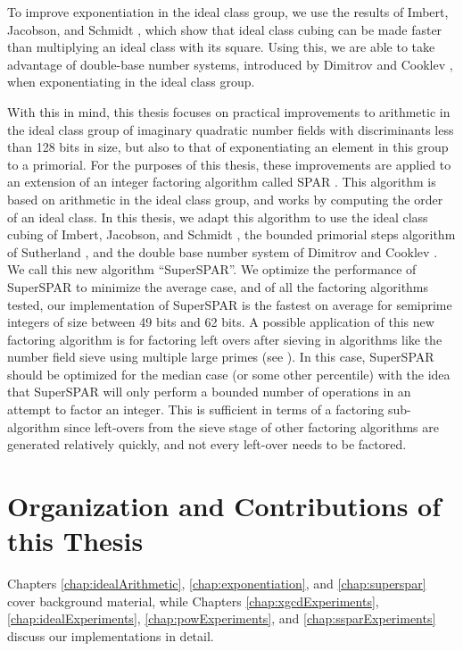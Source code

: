 \documentclass{ucalgthes1}
\theoremstyle{definition}
\begin{document}
To improve exponentiation in the ideal class group, we use the results of Imbert, Jacobson, and Schmidt \cite{Imbert2010}, which show that ideal class cubing can be made faster than multiplying an ideal class with its square.  Using this, we are able to take advantage of double-base number systems, introduced by Dimitrov and Cooklev \cite{Dimitrov1995a, Dimitrov1995b}, when exponentiating in the ideal class group.  

With this in mind, this thesis focuses on practical improvements to arithmetic in the ideal class group of imaginary quadratic number fields with discriminants less than 128 bits in size, but also to that of exponentiating an element in this group to a primorial.  For the purposes of this thesis, these improvements are applied to an extension of an integer factoring algorithm called SPAR \cite{Schnorr1984}.  This algorithm is based on arithmetic in the ideal class group, and works by computing the order of an ideal class.  In this thesis, we adapt this algorithm to use the ideal class cubing of Imbert, Jacobson, and Schmidt \cite{Imbert2010}, the bounded primorial steps algorithm of Sutherland \cite{Sutherland2007}, and the double base number system of Dimitrov and Cooklev \cite{Dimitrov1995a, Dimitrov1995b}.  We call this new algorithm ``SuperSPAR''.  We optimize the performance of SuperSPAR to minimize  the average case, and of all the factoring algorithms tested, our implementation of SuperSPAR is the fastest on average for semiprime integers of size between 49 bits and 62 bits.  A possible application of this new factoring algorithm is for factoring left overs after sieving in algorithms like the number field sieve using multiple large primes (see \cite[\S 6.1.4]{Crandall2001}).  In this case, SuperSPAR should be optimized for the median case (or some other percentile) with the idea that SuperSPAR will only perform a bounded number of operations in an attempt to factor an integer.  This is sufficient in terms of a factoring sub-algorithm since left-overs from the sieve stage of other factoring algorithms are generated relatively quickly, and not every left-over needs to be factored.


\section{Organization and Contributions of this Thesis}

Chapters \ref{chap:idealArithmetic}, \ref{chap:exponentiation}, and \ref{chap:superspar} cover background material, while Chapters \ref{chap:xgcdExperiments}, \ref{chap:idealExperiments}, \ref{chap:powExperiments}, and \ref{chap:ssparExperiments} discuss our implementations in detail.
\end{document}

